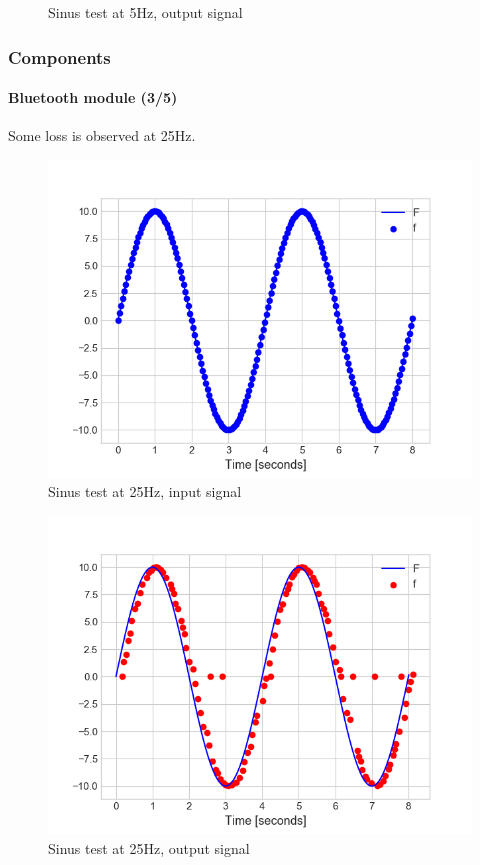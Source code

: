 \documentclass[10pt]{beamer}
\begin{document}
\begin{frame}
\begin{multicols}{2}
\begin{figure}
\caption{Sinus test at 5Hz, output signal}
\end{figure}
\end{multicols}
\end{frame}


\begin{frame}
\frametitle{Components}
\framesubtitle{Bluetooth module (3/5)}
Some loss is observed at 25Hz.
\begin{multicols}{2}
\begin{figure}
\centering
\includegraphics[scale=0.4]{figures/sending-25hz.png}
\caption{Sinus test at 25Hz, input signal}
\end{figure}
\columnbreak
\begin{figure}
\centering
\includegraphics[scale=0.4]{figures/reception-25hz.png}
\caption{Sinus test at 25Hz, output signal}
\end{figure}
\end{multicols}
\end{frame}
\end{document}
